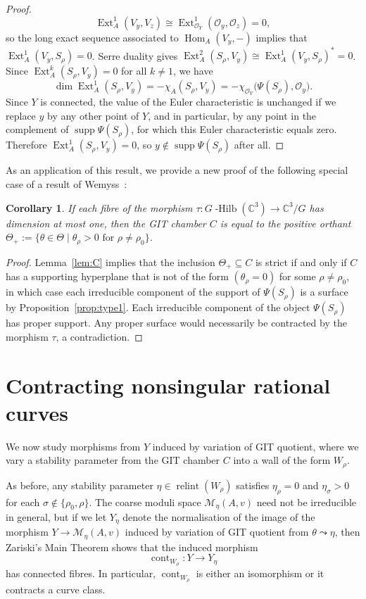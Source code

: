 \documentclass[11pt,reqno]{amsart}
\numberwithin{equation}{section}
\newtheorem{corollary}[theorem]{Corollary}
\theoremstyle{definition}
\newcommand{\cont}{\operatorname{cont}}
\newcommand{\Ext}{\operatorname{Ext}}
\newcommand{\ghilb}{\ensuremath{G}\operatorname{-Hilb}}
\newcommand{\Hom}{\operatorname{Hom}}
\newcommand{\0}{\operatorname{0}}
\newcommand{\relint}{\operatorname{relint}}
\newcommand{\supp}{\operatorname{supp}}
\begin{document}
\begin{proof}
 \[
 \Ext^1_A(V_y,V_z) \cong \Ext^1_{\mathcal{O}_Y}(\mathcal{O}_y,\mathcal{O}_z) =0,
 \]
 so the long exact sequence associated to $\Hom_A(V_y,-)$ implies that $\Ext^1_A(V_y,S_\rho)=0$. Serre duality gives $\Ext^2_A(S_\rho,V_y)\cong \Ext^1_A(V_y,S_\rho)^*=0$.  Since $\Ext_A^k(S_\rho,V_y)=0$ for all $k\neq 1$, we have 
 \[
 \dim\Ext_A^1(S_\rho,V_y) = -\chi_A(S_\rho,V_y) = -\chi_{\mathcal{O}_Y}\big(\Psi(S_\rho),\mathcal{O}_y\big).
 \]
 Since $Y$ is connected, the value of the Euler characteristic is unchanged if we replace $y$ by any other point of $Y$, and in particular, by any point in the complement of $\supp \Psi(S_\rho)$, for which this Euler characteristic equals zero. Therefore $\Ext^1_A(S_\rho,V_y)=0$, so $y\not\in \supp\Psi(S_\rho)$ after all.  \end{proof}

 As an application of this result, we provide a new proof of the following special case of a result of Wemyss~\cite[Lemma~5.18]{Wemyss18}:

 \begin{corollary}
 If each fibre of the morphism $\tau\colon \ghilb(\mathbb{C}^3)\to \mathbb{C}^3/G$ has dimension at most one, then the GIT chamber $C$ is equal to the positive orthant 
 $\Theta_+:= \{\theta\in \Theta \mid \theta_\rho > 0 \text{ for }\rho\neq \rho_0\}$.
 \end{corollary}
 \begin{proof}
  Lemma~\ref{lem:C} implies that the inclusion $\Theta_+\subseteq C$ is strict if and only if $C$ has a supporting hyperplane that is not of the form $(\theta_\rho=0)$ for some $\rho\neq \rho_0$, in which case each irreducible component of the support of $\Psi(S_\rho)$ is a surface by Proposition~\ref{prop:type1}. Each irreducible component of the object $\Psi(S_\rho)$ has proper support. Any proper surface would necessarily be contracted by the morphism $\tau$, a contradiction.
 \end{proof}

 
 
\section{Contracting nonsingular rational curves}
  We now study morphisms from $Y$ induced by variation of GIT quotient, where we vary a stability parameter from the GIT chamber $C$ into a wall of the form $W_\rho$.

 As before, any stability parameter $\eta\in \relint(W_\rho)$ satisfies $\eta_\rho=0$ and $\eta_\sigma> 0$ for each $\sigma\not\in \{\rho_0,\rho\}$. The coarse moduli space $\mathcal{M}_\eta(A,v)$ need not be irreducible in general, but if we let $Y_\eta$ denote the normalisation of the image of the morphism  $Y\to \mathcal{M}_\eta(A,v)$ induced by variation of GIT quotient from $\theta\leadsto \eta$, then Zariski's Main Theorem shows that the induced morphism
 \begin{equation}
     \label{eqn:contWrho}
\cont_{W_\rho}\colon Y\longrightarrow Y_{\eta}
 \end{equation}
 has connected fibres. In particular, $\cont_{W_\rho}$ is either an isomorphism or it contracts a curve class. 
 
\end{document}
